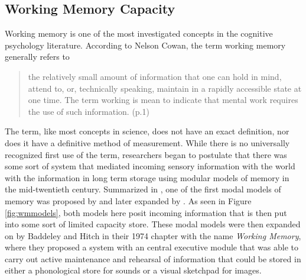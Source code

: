 \documentclass[]{book}
\begin{document}
\hypertarget{working-memory-capacity}{%
\subsection{Working Memory Capacity}\label{working-memory-capacity}}

Working memory is one of the most investigated concepts in the cognitive psychology literature.
According to Nelson Cowan, the term working memory generally refers to

\begin{quote}
the relatively small amount of information that one can hold in mind, attend to, or, technically speaking, maintain in a rapidly accessible state at one time. The term working is mean to indicate that mental work requires the use of such information. (p.1) \citep{cowanWorkingMemoryCapacity2005}
\end{quote}

The term, like most concepts in science, does not have an exact definition, nor does it have a definitive method of measurement.
While there is no universally recognized first use of the term, researchers began to postulate that there was some sort of system that mediated incoming sensory information with the world with the information in long term storage using modular models of memory in the mid-twentieth century.
Summarized in \citep{cowanWorkingMemoryCapacity2005}, one of the first modal models of memory was proposed by \citep{broadbentPerceptionCommunication1958} and later expanded by \citep{atkinsonHUMANMEMORYPROPOSED1968}.
As seen in Figure \ref{fig:wmmodels}, both models here posit incoming information that is then put into some sort of limited capacity store.
These modal models were then expanded on by Baddeley and Hitch \citep{baddeleyWorkingMemory1974} in their 1974 chapter with the name \emph{Working Memory}, where they proposed a system with an central executive module that was able to carry out active maintenance and rehearsal of information that could be stored in either a phonological store for sounds or a visual sketchpad for images.
\end{document}
